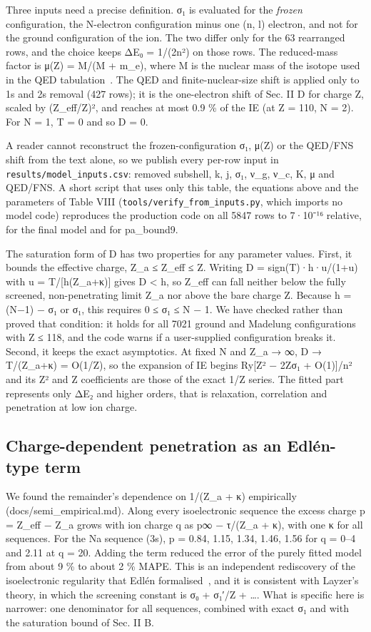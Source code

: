 \documentclass[aps,pra,preprint,superscriptaddress,amsmath,amssymb]{revtex4-2}
\begin{document}
Three inputs need a precise definition. σ₁ is evaluated for the \emph{frozen} configuration, the N-electron configuration minus one (n, l) electron, and not for the ground configuration of the ion. The two differ only for the 63 rearranged rows, and the choice keeps ΔE₀ = 1/(2n²) on those rows. The reduced-mass factor is μ(Z) = M/(M + m\_e), where M is the nuclear mass of the isotope used in the QED tabulation~\cite{r31}. The QED and finite-nuclear-size shift is applied only to 1s and 2s removal (427 rows); it is the one-electron shift of Sec. II D for charge Z, scaled by (Z\_eff/Z)², and reaches at most 0.9 \% of the IE (at Z = 110, N = 2). For N = 1, T = 0 and so D = 0.


A reader cannot reconstruct the frozen-configuration σ₁, μ(Z) or the QED/FNS shift from the text alone, so we publish every per-row input in \texttt{results/model\_inputs.csv}: removed subshell, k, j, σ₁, ν\_g, ν\_c, K, μ and QED/FNS. A short script that uses only this table, the equations above and the parameters of Table VIII (\texttt{tools/verify\_from\_inputs.py}, which imports no model code) reproduces the production code on all 5847 rows to 7·10⁻¹⁶ relative, for the final model and for pa\_bound9.


The saturation form of D has two properties for any parameter values. First, it bounds the effective charge, Z\_a ≤ Z\_eff ≤ Z. Writing D = sign(T)·h·u/(1+u) with u = \textbar{}T\textbar{}/[h(Z\_a+κ)] gives \textbar{}D\textbar{} < h, so Z\_eff can fall neither below the fully screened, non-penetrating limit Z\_a nor above the bare charge Z. Because h = (N−1) − σ₁ or σ₁, this requires 0 ≤ σ₁ ≤ N − 1. We have checked rather than proved that condition: it holds for all 7021 ground and Madelung configurations with Z ≤ 118, and the code warns if a user-supplied configuration breaks it. Second, it keeps the exact asymptotics. At fixed N and Z\_a → ∞, D → T/(Z\_a+κ) = O(1/Z), so the expansion of IE begins Ry[Z² − 2Zσ₁ + O(1)]/n² and its Z² and Z coefficients are those of the exact 1/Z series. The fitted part represents only ΔE₂ and higher orders, that is relaxation, correlation and penetration at low ion charge.


\subsection{Charge-dependent penetration as an Edlén-type term}

We found the remainder's dependence on 1/(Z\_a + κ) empirically (docs/semi\_empirical.md). Along every isoelectronic sequence the excess charge p = Z\_eff − Z\_a grows with ion charge q as p∞ − τ/(Z\_a + κ), with one κ for all sequences. For the Na sequence (3s), p = 0.84, 1.15, 1.34, 1.46, 1.56 for q = 0–4 and 2.11 at q = 20. Adding the term reduced the error of the purely fitted model from about 9 \% to about 2 \% MAPE. This is an independent rediscovery of the isoelectronic regularity that Edlén formalised~\cite{r8}, and it is consistent with Layzer's theory, in which the screening constant is σ₀ + σ₁′/Z + …. What is specific here is narrower: one denominator for all sequences, combined with exact σ₁ and with the saturation bound of Sec. II B.
\end{document}
